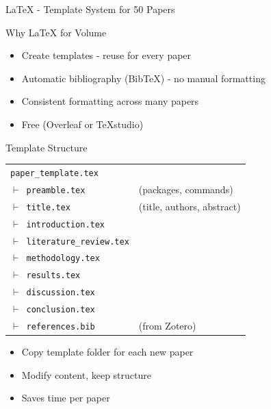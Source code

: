 \documentclass[11pt]{beamer}
\begin{document}
	\begin{frame}{LaTeX - Template System for 50 Papers}
		\scriptsize
		\begin{block}{Why LaTeX for Volume}
			\begin{itemize}
				\item Create templates - reuse for every paper
				\item Automatic bibliography (BibTeX) - no manual formatting
				\item Consistent formatting across many papers
				\item Free (Overleaf or TeXstudio)
			\end{itemize}
		\end{block}
		\begin{block}{Template Structure}
			\centering
			\begin{tabular}{ll}
				\multicolumn{2}{l}{\texttt{paper\_template.tex}} \\
				\texttt{$\vdash$ preamble.tex} & (packages, commands) \\
				\texttt{$\vdash$ title.tex} & (title, authors, abstract) \\
				\texttt{$\vdash$ introduction.tex} & \\
				\texttt{$\vdash$ literature\_review.tex} & \\
				\texttt{$\vdash$ methodology.tex} & \\
				\texttt{$\vdash$ results.tex} & \\
				\texttt{$\vdash$ discussion.tex} & \\
				\texttt{$\vdash$ conclusion.tex} & \\
				\texttt{$\vdash$ references.bib} & (from Zotero) \\
			\end{tabular}
		\end{block}
		\begin{itemize}
			\item Copy template folder for each new paper
			\item Modify content, keep structure
			\item Saves time per paper
		\end{itemize}
	\end{frame}
	
\end{document}
